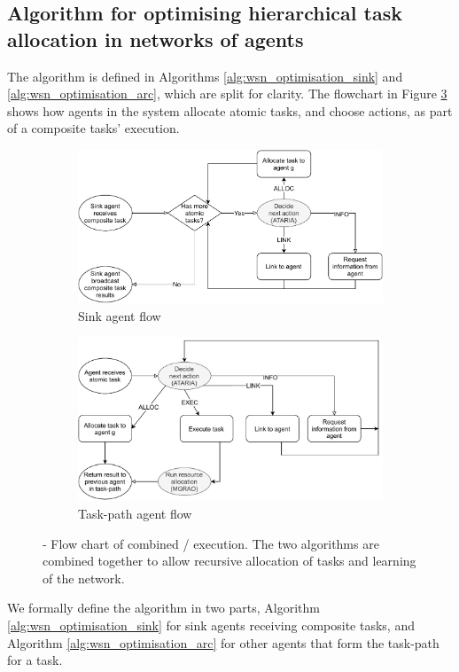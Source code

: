\newcommand{\functionANHTAO}[2]{
	\functionSignature{\texttt{anhtao-path}}{\varAtomicTask{}{}, \varAgent{}{}}
}

\subsection{Algorithm for optimising hierarchical task allocation in networks of agents}

The \acronymWSNOptimisationExtended{}{} algorithm is defined in Algorithms \ref{alg:wsn_optimisation_sink}
and \ref{alg:wsn_optimisation_arc}, which are split for clarity. The flowchart in Figure \ref{fig:algorithm-flow} shows how agents in the system allocate atomic tasks, and choose actions, as part of a composite tasks' execution.

\begin{figure}[ht]
	\centering
	\begin{subfigure}{.49\textwidth}
		\centering
		\includegraphics[width=0.9\linewidth, trim={25pt 0pt 25pt 0pt, clip}]{algorithm-flow-sink}
		\caption{Sink agent flow}
		\label{fig:algorithm-flow-sink}
	\end{subfigure} \hfill%
	\begin{subfigure}{.49\textwidth}
		\centering	\includegraphics[width=0.9\linewidth,trim={25pt 0pt 25pt 0pt, clip}]{algorithm-flow-arc}
		\caption{Task-path agent flow}
		\label{fig:algorithm-flow-arc}
	\end{subfigure}
	\caption{\textbf{\acronymWSNOptimisation{}{}} - Flow chart of combined \acronymATARIA{}{}/\acronymMGRAO{}{} execution. The two algorithms are combined together to allow recursive allocation of tasks and learning of the network.}
	\label{fig:algorithm-flow}
\end{figure}
We formally define the \acronymWSNOptimisation{}{} algorithm in two parts, Algorithm \ref{alg:wsn_optimisation_sink} for sink agents receiving composite tasks, and Algorithm \ref{alg:wsn_optimisation_arc} for other agents that form the task-path for a task.

